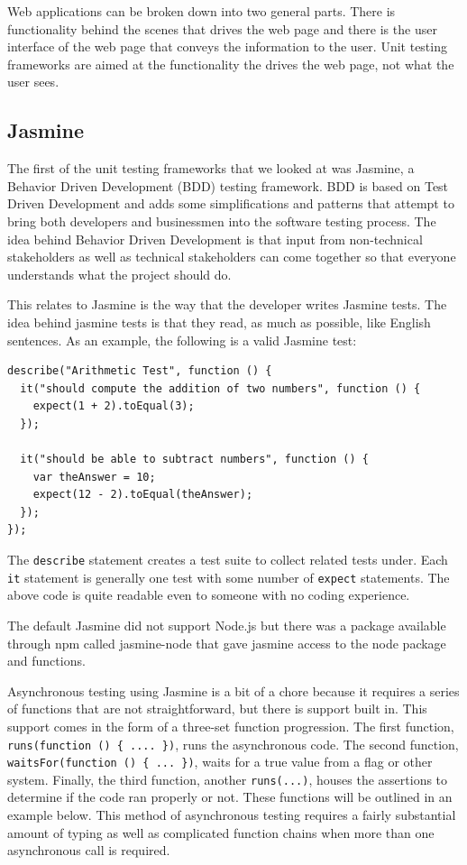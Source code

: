 \documentclass[12pt]{ucthesis}
\begin{document}
Web applications can be broken down into two general parts. There is functionality behind the scenes that drives the web page and there is the user interface of the web page that conveys the information to the user. Unit testing frameworks are aimed at the functionality the drives the web page, not what the user sees.

\subsection{Jasmine}
The first of the unit testing frameworks that we looked at was Jasmine\cite{Jasmine}, a Behavior Driven Development (BDD) testing framework. BDD is based on Test Driven Development and adds some simplifications and patterns that attempt to bring both developers and businessmen into the software testing process. The idea behind Behavior Driven Development is that input from non-technical stakeholders as well as technical stakeholders can come together so that everyone understands what the project should do.

This relates to Jasmine is the way that the developer writes Jasmine tests. The idea behind jasmine tests is that they read, as much as possible, like English sentences. As an example, the following is a valid Jasmine test:
\begin{lstlisting}
describe("Arithmetic Test", function () {
  it("should compute the addition of two numbers", function () {
    expect(1 + 2).toEqual(3);
  });

  it("should be able to subtract numbers", function () {
    var theAnswer = 10;
    expect(12 - 2).toEqual(theAnswer);
  });
});
\end{lstlisting}
The \lstinline{describe} statement creates a test suite to collect related tests under. Each \lstinline{it} statement is generally one test with some number of \lstinline{expect} statements. The above code is quite readable even to someone with no coding experience.

The default Jasmine did not support Node.js but there was a package available through npm called jasmine-node \cite{JasmineNode} that gave jasmine access to the node package and functions. 

Asynchronous testing using Jasmine is a bit of a chore because it requires a series of functions that are not straightforward, but there is support built in. This support comes in the form of a three-set function progression. The first function, \lstinline!runs(function () { .... })!, runs the asynchronous code. The second function, \lstinline!waitsFor(function () { ... })!, waits for a true value from a flag or other system. Finally, the third function, another \lstinline{runs(...)}, houses the assertions to determine if the code ran properly or not. These functions will be outlined in an example below. This method of asynchronous testing requires a fairly substantial amount of typing as well as complicated function chains when more than one asynchronous call is required.
\end{document}
